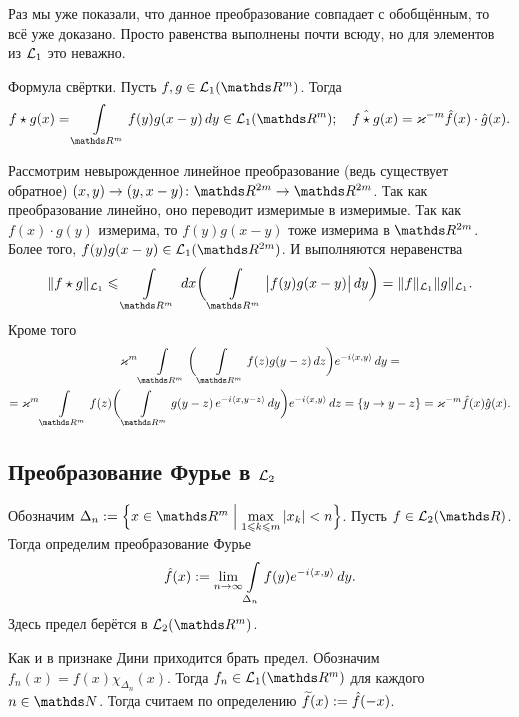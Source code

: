 Раз мы уже показали, что данное преобразование совпадает с обобщённым, то всё уже доказано. Просто равенства выполнены почти всюду, но для элементов из $\mathcal L_1$ это неважно.

\begin{Ut}
  Формула свёртки. Пусть $f,g\in\L_1(\R^m)$. Тогда
\[
  f\star g(x) = \Gint{\R^m} f(y)g(x-y)\,dy\in\L_1(\R^m);\quad
  \hat{f\star g}(x) = \k^{-m} \hat f(x)\cdot \hat g(x).
\]
\end{Ut}
\begin{Proof}
 Рассмотрим невырожденное линейное преобразование (ведь существует обратное) $(x,y)\to(y,x-y)\colon \R^{2m}\to\R^{2m}$. Так как преобразование линейно, оно переводит измеримые в измеримые. Так как $f(x)\cdot g(y)$  измерима, то $f(y)g(x-y)$ тоже измерима в $\R^{2m}$. Более того, $f(y)g(x-y)\in\L_1(\R^{2m})$. И выполняются неравенства
\[
  \|f\star g\|_{\L_1}\le \Gint{\R^m}\,dx\bigg(\Gint{\R^m}\big|f(y)g(x-y)\big|\,dy\bigg) = \|f\|_{\L_1}\|g\|_{\L_1}.
\]
Кроме того
\begin{multline*}
  \k^m\Gint{\R^m}\bigg(\Gint{\R^m}f(z)g(y-z)\,dz\bigg)e^{-i\la x,y\ra}\,dy=\\=
  \k^m\Gint{\R^m} f(z)\bigg(\Gint{\R^m}g(y-z)\,e^{-i\la x,y-z\ra}\,dy\bigg) e^{-i\la x,y\ra}\,dz = \{ y\to y-z\} =\k^{-m}\hat f(x)\hat g(x).
\end{multline*}
\end{Proof}
\subsection{Преобразование Фурье в $\mathcal L_2$}
\begin{Def}
 Обозначим $\Delta_n:=\Big\{ x\in\R^m\Bigm|\max\limits_{1\le k\le m}|x_k|<n\Big\}$. Пусть $f\in\L_2(\R)$. Тогда определим преобразование Фурье
\[
  \hat f(x):=\lim\limits_{n\rightarrow\infty} \int\limits_{\Delta_n} f(y) e^{-i\langle x,y\rangle}\,dy.
\]
Здесь предел берётся в $\L_2(\R^m)$.
\end{Def}
Как и в признаке Дини приходится брать предел. Обозначим $f_n(x) = f(x)\chi_{\Delta_n}(x)$. Тогда $f_n\in\L_1(\R^m)$ для каждого $n\in\N$. Тогда считаем по определению $\widetilde{f}{}(x) := \hat f(-x)$.

